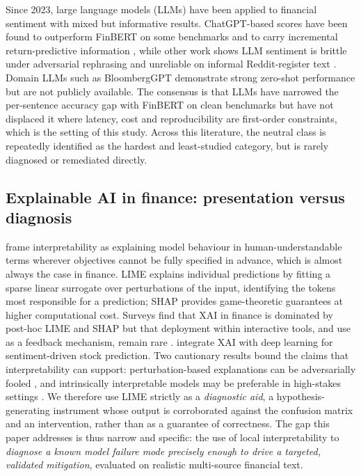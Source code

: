 \documentclass[12pt,a4paper]{article}
\begin{document}
Since 2023, large language models (LLMs) have been applied to financial sentiment
with mixed but informative results. ChatGPT-based scores have been found to
outperform FinBERT on some benchmarks and to carry incremental return-predictive
information \citep{fatouros2023,lopezlira2023}, while other work shows LLM sentiment
is brittle under adversarial rephrasing \citep{leippold2023} and unreliable on
informal Reddit-register text \citep{deng2023}. Domain LLMs such as BloombergGPT
\citep{wu2023} demonstrate strong zero-shot performance but are not publicly
available. The consensus is that LLMs have narrowed the per-sentence accuracy gap
with FinBERT on clean benchmarks but have not displaced it where latency, cost and
reproducibility are first-order constraints, which is the setting of this study.
Across this literature, the neutral class is repeatedly identified as the hardest
and least-studied category, but is rarely diagnosed or remediated directly.

\subsection{Explainable AI in finance: presentation versus diagnosis}
\citet{doshivelez2017} frame interpretability as explaining model behaviour in
human-understandable terms wherever objectives cannot be fully specified in
advance, which is almost always the case in finance. LIME \citep{ribeiro2016}
explains individual predictions by fitting a sparse linear surrogate over
perturbations of the input, identifying the tokens most responsible for a
prediction; SHAP \citep{lundberg2017} provides game-theoretic guarantees at higher
computational cost. Surveys find that XAI in finance is dominated by post-hoc LIME
and SHAP but that deployment within interactive tools, and use as a feedback
mechanism, remain rare \citep{yeo2025}. \citet{sravankumar2025} integrate XAI with
deep learning for sentiment-driven stock prediction. Two cautionary
results bound the claims that interpretability can support: perturbation-based
explanations can be adversarially fooled \citep{slack2020}, and intrinsically
interpretable models may be preferable in high-stakes settings \citep{rudin2019}.
We therefore use LIME strictly as a \emph{diagnostic aid}, a hypothesis-generating
instrument whose output is corroborated against the confusion matrix and an
intervention, rather than as a guarantee of correctness. The gap this paper
addresses is thus narrow and specific: the use of local interpretability to
\emph{diagnose a known model failure mode precisely enough to drive a targeted,
validated mitigation}, evaluated on realistic multi-source financial text.
\end{document}
